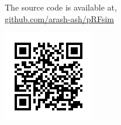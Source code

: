 \documentclass[portrait,final,a0paper,fontscale=0.277]{baposter}
\begin{document}
\begin{poster}
{\begin{minipage}{\linewidth}
\begin{minipage}{0.83\linewidth}
					
					The source code is available at, \\
					\url{github.com/arash-ash/pRFsim}
				\end{minipage}\hfill%
				\begin{minipage}{0.17\linewidth}
					\hfill\includegraphics[width=\linewidth]{chart}
				\end{minipage}
				\smaller
			\end{minipage}
			\vspace{0.3em}
		}
		
		
	\end{poster}
	
\end{document}
